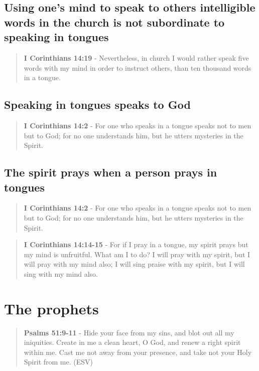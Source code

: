 \documentclass[11pt]{article}
\begin{document}
\subsection{Using one's mind to speak to others intelligible words in the church is not subordinate to speaking in tongues}
\label{sec:org3cbef41}
\begin{quote}
\textbf{I Corinthians 14:19} - Nevertheless, in church I would rather speak five words with my mind in order to instruct others, than ten thousand words in a tongue.
\end{quote}

\subsection{Speaking in tongues speaks to God}
\label{sec:org8ce45b4}
\begin{quote}
\textbf{I Corinthians 14:2} - For one who speaks in a tongue speaks not to men but to God; for no one understands him, but he utters mysteries in the Spirit.
\end{quote}

\subsection{The spirit prays when a person prays in tongues}
\label{sec:org69b88ea}
\begin{quote}
\textbf{I Corinthians 14:2} - For one who speaks in a tongue speaks not to men but to God; for no one understands him, but he utters mysteries in the Spirit.
\end{quote}

\begin{quote}
\textbf{I Corinthians 14:14-15} - For if I pray in a tongue, my spirit prays but my mind is unfruitful. What am I to do? I will pray with my spirit, but I will pray with my mind also; I will sing praise with my spirit, but I will sing with my mind also.
\end{quote}

\section{The prophets}
\label{sec:org344be5d}
\begin{quote}
\textbf{Psalms 51:9-11} - Hide your face from my sins, and blot out all my iniquities. Create in me a clean heart, O God, and renew a right spirit within me. Cast me not away from your presence, and take not your Holy Spirit from me. (ESV)
\end{quote}
\end{document}
